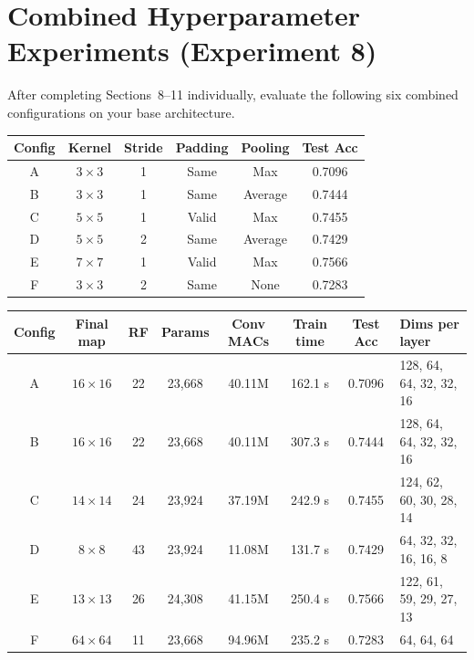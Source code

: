 \documentclass[12pt,a4paper]{article}
\begin{document}
\section{Combined Hyperparameter Experiments (Experiment 8)}

After completing Sections~8--11 individually, evaluate the following six combined
configurations on your base architecture.

\begin{center}
\renewcommand{\arraystretch}{1.3}
\begin{tabular}{|c|c|c|c|c|c|}
\hline
\textbf{Config} & \textbf{Kernel} & \textbf{Stride} & \textbf{Padding} & \textbf{Pooling} & \textbf{Test Acc} \\
\hline
A & $3\times3$ & 1 & Same & Max & 0.7096 \\
\hline
B & $3\times3$ & 1 & Same & Average & 0.7444 \\
\hline
C & $5\times5$ & 1 & Valid & Max & 0.7455 \\
\hline
D & $5\times5$ & 2 & Same & Average & 0.7429 \\
\hline
E & $7\times7$ & 1 & Valid & Max & 0.7566 \\
\hline
F & $3\times3$ & 2 & Same & None & 0.7283 \\
\hline
\end{tabular}
\end{center}

\begin{center}
\renewcommand{\arraystretch}{1.2}\footnotesize
\setlength{\tabcolsep}{3pt}
\begin{tabular}{|c|c|c|c|c|c|c|p{3.9cm}|}
\hline
\textbf{Config} & \textbf{Final map} & \textbf{RF} & \textbf{Params} & \textbf{Conv MACs} & \textbf{Train time} & \textbf{Test Acc} & \textbf{Dims per layer} \\ \hline
A & $16\times16$ & 22 & 23,668 & 40.11M & 162.1 s & 0.7096 & 128, 64, 64, 32, 32, 16 \\ \hline
B & $16\times16$ & 22 & 23,668 & 40.11M & 307.3 s & 0.7444 & 128, 64, 64, 32, 32, 16 \\ \hline
C & $14\times14$ & 24 & 23,924 & 37.19M & 242.9 s & 0.7455 & 124, 62, 60, 30, 28, 14 \\ \hline
D & $8\times8$ & 43 & 23,924 & 11.08M & 131.7 s & 0.7429 & 64, 32, 32, 16, 16, 8 \\ \hline
E & $13\times13$ & 26 & 24,308 & 41.15M & 250.4 s & 0.7566 & 122, 61, 59, 29, 27, 13 \\ \hline
F & $64\times64$ & 11 & 23,668 & 94.96M & 235.2 s & 0.7283 & 64, 64, 64 \\ \hline
\end{tabular}
\end{center}
\end{document}

